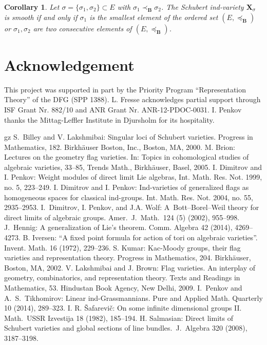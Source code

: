 \documentclass[12pt]{amsart}
\newtheorem{corollary}{Corollary}
\theoremstyle{definition}
\begin{document}
\begin{corollary}
Let $\sigma=\{\sigma_1,\sigma_2\}\subset E$ with $\sigma_1\prec_\mathbf{B}\sigma_2$.
The Schubert ind-variety $\mathbf{X}_\sigma$ is smooth if and only if $\sigma_1$ is the smallest element of the ordered set $(E,\preceq_\mathbf{B})$ or $\sigma_1,\sigma_2$ are two consecutive elements of $(E,\preceq_\mathbf{B})$.
\end{corollary}

\section*{Acknowledgement}

This project was supported in part by the Priority Program ``Representation Theory'' of the DFG (SPP 1388).
L. Fresse acknowledges partial support through
ISF Grant Nr. 882/10 and ANR Grant Nr. ANR-12-PDOC-0031.
I. Penkov thanks the Mittag-Leffler Institute in Djursholm for its hospitality.



\begin{thebibliography}{gz}
 S.\ Billey and V. Lakshmibai: Singular loci of Schubert varieties. Progress in Mathematics, 182. Birkh\"auser Boston, Inc., Boston, MA, 2000.
 M. Brion: Lectures on the geometry flag varieties. In: Topics in cohomological studies of algebraic varieties,  33--85, Trends Math., Birkh\"auser, Basel, 2005.
 I. Dimitrov and I. Penkov: Weight modules of direct limit Lie algebras, Int. Math. Res. Not. 1999, no. 5, 223--249.
 I. Dimitrov and I. Penkov: Ind-varieties of generalized flags as homogeneous spaces for classical ind-groups. Int. Math. Res. Not. 2004, no. 55, 2935--2953.
 I.\ Dimitrov, I. Penkov, and J.A. Wolf: A\ Bott--Borel--Weil theory for direct limits of algebraic groups. Amer.\ J.\ Math.\ 124 (5) (2002), 955--998.
 J.\ Hennig: A generalization of Lie's theorem. Comm. Algebra  42  (2014), 4269--4273.
 B. Iversen: ``A fixed point formula for action of tori on algebraic varieties''. Invent. Math. 16 (1972), 229--236.
 S. Kumar: Kac-Moody groups, their flag varieties and representation theory. Progress in Mathematics, 204. Birkh\"auser, Boston, MA, 2002.  V. Lakshmibai and J. Brown: Flag varieties. An interplay of geometry, combinatorics, and representation theory. Texts and Readings in Mathematics, 53. Hindustan Book Agency, New Delhi, 2009.
 I.\ Penkov and A.\ S.\ Tikhomirov: Linear ind-Grassmannians. Pure and Applied Math. Quarterly 10 (2014), 289--323.
 I. R. \v{S}afarevi\v{c}: On some infinite dimensional groups II. Math.\ USSR Izvestija 18 (1982), 185--194.
 H. Salmasian: Direct limits of Schubert varieties and global sections of line bundles.\ J.\ Algebra 320 (2008), 3187--3198.
\end{thebibliography}
\end{document}
